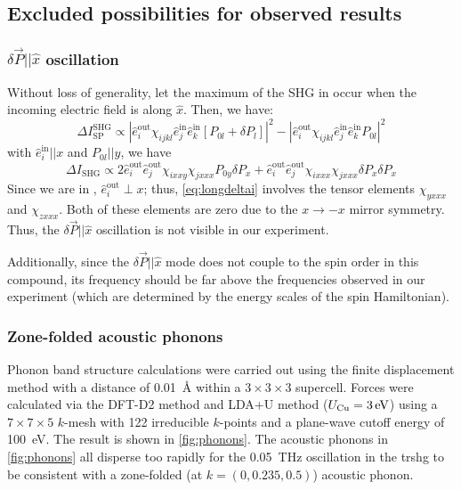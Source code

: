 \subsection{Excluded possibilities for observed results}\label{sup:excluded}
\subsubsection{$\delta \vec{P} || \hat{x}$ oscillation\label{sup:nopxmode}}

Without loss of generality, let the maximum of the SHG in \SP occur when the incoming electric field is along $\hat{x}$.
Then, we have:
\begin{equation}
\Delta I_\mathrm{SP}^\mathrm{SHG} \propto |\hat{e}^\mathrm{out}_i \chi_{ijkl}\hat{e}^\mathrm{in}_j\hat{e}^\mathrm{in}_k[P_{0l}+\delta P_l]|^2-|\hat{e}^\mathrm{out}_i \chi_{ijkl}\hat{e}^\mathrm{in}_j\hat{e}^\mathrm{in}_kP_{0l}|^2
\end{equation}
with $\hat{e}^\mathrm{in}_i || x$ and $P_{0l} || y$, we have
\begin{equation}
\label{eq:longdeltai}
\Delta I_\mathrm{SHG} \propto 2\hat{e}^\mathrm{out}_i \hat{e}^\mathrm{out}_j\chi_{ixxy} \chi_{jxxx}P_{0y}\delta P_x + \hat{e}^\mathrm{out}_i \hat{e}^\mathrm{out}_j\chi_{ixxx} \chi_{jxxx}\delta P_x\delta P_x 
\end{equation}
Since we are in \SP, $\hat{e}^\mathrm{out}_i \perp x$; thus, \cref{eq:longdeltai} involves the tensor elements $\chi_{yxxx}$ and $\chi_{zxxx}$.
Both of these elements are zero due to the $x \rightarrow -x$ mirror symmetry.
Thus, the $\delta \vec{P} || \hat{x}$ oscillation is not visible in our experiment.

Additionally, since the $\delta \vec{P} || \hat{x}$ mode does not couple to the spin order in this compound\cite{katsura_dynamical_2007}, its frequency should be far above the frequencies observed in our experiment (which are determined by the energy scales of the spin Hamiltonian).

\subsubsection{Zone-folded acoustic phonons}\label{sup:phonons}

Phonon band structure calculations were carried out using the finite displacement method\citep{togo_first_2015} with a distance of \qty{0.01}{\angstrom} within a $3\times3\times3$ supercell.
Forces were calculated via the DFT-D2 method\cite{grimme_semiempirical_2006} and LDA+U method\cite{dudarev_electron-energy-loss_1998} ($U_\mathrm{\ce{Cu}}=\qty{3}{eV}$) using a $7\times7\times5$ $k$-mesh with \num{122} irreducible $k$-points and a plane-wave cutoff energy of \qty{100}{eV}.
The result is shown in \cref{fig:phonons}.
The acoustic phonons in \cref{fig:phonons} all disperse too rapidly for the \qty{0.05}{THz} oscillation in the \gls{trshg} to be consistent with a zone-folded (at $k=(0, 0.235, 0.5)$) acoustic phonon.

